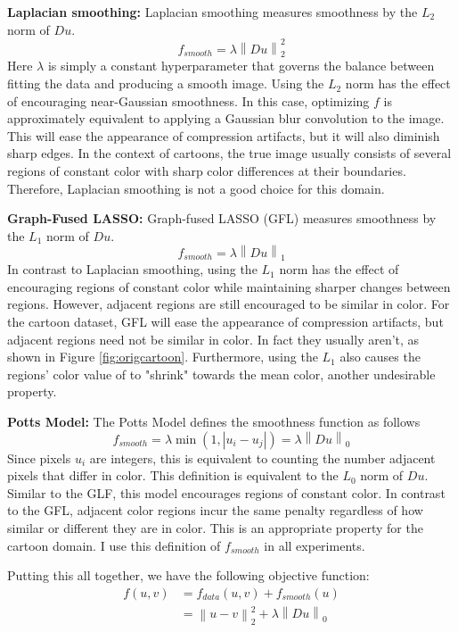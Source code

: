 \documentclass[10pt,twocolumn,letterpaper]{article}
\begin{document}
{\bf Laplacian smoothing: }Laplacian smoothing  measures smoothness by the $L_2$ norm of $Du$.
$$
	f_{smooth} = \lambda \left \| Du \right \|_2^2
$$
Here $\lambda$ is simply a constant hyperparameter that governs the balance between fitting the data and producing a smooth image. Using the $L_2$ norm has the effect of encouraging near-Gaussian smoothness. In this case, optimizing $f$ is approximately equivalent to applying a Gaussian blur convolution to the image. This will ease the appearance of compression artifacts, but it will also diminish sharp edges. In the context of cartoons, the true image usually consists of several regions of constant color with sharp color differences at their boundaries. Therefore, Laplacian smoothing is not a good choice for this domain.

{\bf Graph-Fused LASSO: } Graph-fused LASSO (GFL) measures smoothness by the $L_1$ norm of $Du$.
$$
	f_{smooth} = \lambda \left \| Du \right \|_1
$$
In contrast to Laplacian smoothing, using the $L_1$ norm has the effect of encouraging regions of constant color while maintaining sharper changes between regions. However, adjacent regions are still encouraged to be similar in color. For the cartoon dataset, GFL will ease the appearance of compression artifacts, but adjacent regions need not be similar in color. In fact they usually aren't, as shown in Figure \ref{fig:origcartoon}. Furthermore, using the $L_1$ also causes the regions' color value of to "shrink" towards the mean color, another undesirable property.

{\bf Potts Model: } The Potts Model defines the smoothness function as follows
$$
	f_{smooth} = \lambda \min(1, |u_i - u_j|) = \lambda \left \| Du \right \|_0
$$
Since pixels $u_i$ are integers, this is equivalent to counting the number adjacent pixels that differ in color. This definition is equivalent to the $L_0$ norm of $Du$. Similar to the GLF, this model encourages regions of constant color. In contrast to the GFL, adjacent color regions incur the same penalty regardless of how similar or different they are in color. This is an appropriate property for the cartoon domain. I use this definition of $f_{smooth}$ in all experiments.

Putting this all together, we have the following objective function:
\begin{align} \label{eq:objfn0}
	f(u, v) &= f_{data}(u, v) + f_{smooth}(u) \\
    &= \left \| u - v \right \|_2^2 + \lambda \left \| Du \right \|_0 \label{eq:objfn}
\end{align}
\end{document}
